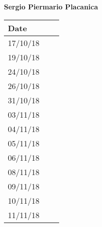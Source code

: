 \documentclass[../main.tex]{subfiles}
\begin{document}
\begin{center}
	{\bf Sergio Piermario Placanica}
	\vspace{2mm}

		\begin{tabular}{p{1.3cm}|p{1.8cm}|p{6.7cm}}
			\hline
			\bf Date & \bf \makebox[1.8cm][c]{Hours} & \bf \makebox[6.7cm][c]{Description} \\
			\hline
			17/10/18 & \makebox[1.8cm][c]{2h} & \makebox[6.7cm][c]{Introduction}\\
			19/10/18 & \makebox[1.8cm][c]{3h} & \makebox[6.7cm][c]{Goals, Requirements, Domain assumptions}\\
			24/10/18 & \makebox[1.8cm][c]{4h} & \makebox[6.7cm][c]{Goals, Requirements, Domain assumptions}\\
			26/10/18 & \makebox[1.8cm][c]{2h} & \makebox[6.7cm][c]{Purpose, Scope}\\
			31/10/18 & \makebox[1.8cm][c]{2h} & \makebox[6.7cm][c]{Use Cases}\\
			03/11/18 & \makebox[1.8cm][c]{5h} & \makebox[6.7cm][c]{Mockups, Scenarios}\\
			04/11/18 & \makebox[1.8cm][c]{5h} & \makebox[6.7cm][c]{UML Class \& State Machine Diagrams}\\
			05/11/18 & \makebox[1.8cm][c]{1h} & \makebox[6.7cm][c]{Scenarios, Sequence Diagram}\\
			06/11/18 & \makebox[1.8cm][c]{4h} & \makebox[6.7cm][c]{Mockups, Alloy}\\
			08/11/18 & \makebox[1.8cm][c]{4h} & \makebox[6.7cm][c]{Mockups, Sequence Diagramm, Alloy}\\
			09/11/18 & \makebox[1.8cm][c]{4h} & \makebox[6.7cm][c]{Alloy, Revisioning}\\
			10/11/18 & \makebox[1.8cm][c]{4h} & \makebox[6.7cm][c]{Alloy, Revisioning}\\
			11/11/18 & \makebox[1.8cm][c]{4h} & \makebox[6.7cm][c]{Revisioning}\\
		\end{tabular}
\end{center}
\end{document}
